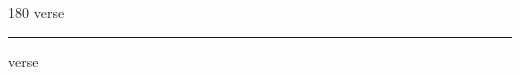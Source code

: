 
\begin{frame}
\begin{center}
\begin{turn}{180}
{\fontsize{2.5cm}{1em}\selectfont verse}
\end{turn}
\vspace{1em}\par  
\hrule
\vspace{1em}\par  
{\fontsize{2.5cm}{1em}\selectfont verse}
\end{center}
\end{frame}

